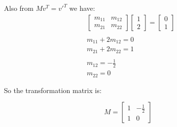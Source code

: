 \documentclass{ximera}
\begin{document}
Also from  $M v^T = v'^T$ we have:
\begin{align*}
&\begin{bmatrix}
m_{11} & m_{12} \\
m_{21} & m_{22}
\end{bmatrix}
\begin{bmatrix}
1 \\
2
\end{bmatrix}
= 
\begin{bmatrix}
0 \\
1
\end{bmatrix} \\
\\
& m_{11} + 2 m_{12} = 0 \\
& m_{21} + 2 m_{22} = 1 \\
\\
&m_{12} = - \frac{1}{2} \\
&m_{22} = 0
\end{align*}

So the transformation matrix is:
\begin{center}
\begin{equation*}
M =
\begin{bmatrix}
1 & -\frac{1}{2} \\
1 & 0
\end{bmatrix}
\end{equation*}
\end{center}
\end{document}
